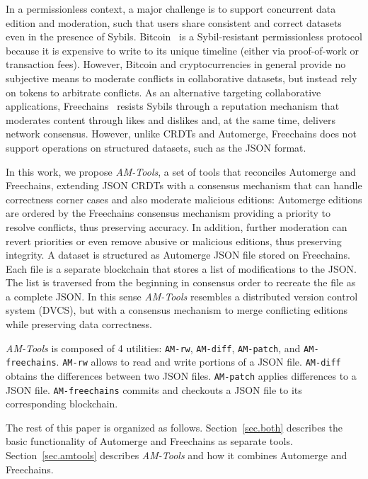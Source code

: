 \documentclass[12pt]{article}
\newcommand{\code}[1]  {\texttt{\footnotesize{#1}}}
\begin{document}
In a permissionless context, a major challenge is to support concurrent data
edition and moderation, such that users share consistent and correct datasets
even in the presence of Sybils.
%
Bitcoin~\cite{nakamoto2008bitcoin} is a Sybil-resistant permissionless protocol
because it is expensive to write to its unique timeline (either via
proof-of-work or transaction fees).
However, Bitcoin and cryptocurrencies in general provide no subjective means to
moderate conflicts in collaborative datasets, but instead rely on tokens to
arbitrate conflicts.
%
As an alternative targeting collaborative applications,
Freechains~\cite{sant2020freechains} resists Sybils through a reputation
mechanism that moderates content through likes and dislikes and, at the same
time, delivers network consensus.
However, unlike CRDTs and Automerge, Freechains does not support operations on
structured datasets, such as the JSON format.

In this work, we propose \emph{AM-Tools}, a set of tools that reconciles
Automerge and Freechains, extending JSON CRDTs with a consensus mechanism that
can handle correctness corner cases and also moderate malicious editions:
Automerge editions are ordered by the Freechains consensus mechanism providing
a priority to resolve conflicts, thus preserving accuracy.
In addition, further moderation can revert priorities or even remove abusive or
malicious editions, thus preserving integrity.
%
A dataset is structured as Automerge JSON file stored on Freechains.
Each file is a separate blockchain that stores a list of modifications to the
JSON.
The list is traversed from the beginning in consensus order to recreate the
file as a complete JSON.
%
In this sense \emph{AM-Tools} resembles a distributed version control system
(DVCS), but with a consensus mechanism to merge conflicting editions while
preserving data correctness.

\emph{AM-Tools} is composed of 4 utilities: \code{AM-rw}, \code{AM-diff},
\code{AM-patch}, and \code{AM-freechains}.
%
\code{AM-rw} allows to read and write portions of a JSON file.
\code{AM-diff} obtains the differences between two JSON files.
\code{AM-patch} applies differences to a JSON file.
\code{AM-freechains} commits and checkouts a JSON file to its corresponding
blockchain.

The rest of this paper is organized as follows.
Section~\ref{sec.both} describes the basic functionality of Automerge and
Freechains as separate tools.
Section~\ref{sec.amtools} describes \emph{AM-Tools} and how it combines
Automerge and Freechains.
\end{document}
